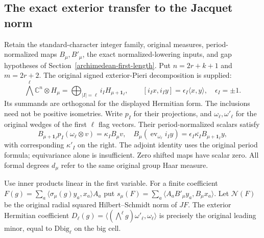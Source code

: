 \subsection{The exact exterior transfer to the Jacquet norm}
\label{archimedean-jacquet-gram}

Retain the standard-character integer family, original measures,
period-normalized maps $B_\mu,B'_\mu$, the exact normalized-lowering
inputs, and gap hypotheses of
Section~\ref{archimedean-first-length}. Put $n=2r+k+1$ and
$m=2r+2$. The original signed exterior-Pieri decomposition
is supplied:
\[
 \bigwedge^\ell\mathbb C^n\otimes H_\mu
       =\bigoplus_{|I|=\ell}i_IH_{\mu+\mathbf1_I},\qquad
 [i_Ix,i_Iy]=\epsilon_I\langle x,y\rangle,\quad\epsilon_I=\pm1.
\]
Its summands are orthogonal for the displayed Hermitian form.
The inclusions need not be positive isometries. Write $p_I$ for
their projections, and $\omega_\ell,\omega'_\ell$ for the original
wedges of the first $\ell$ flag vectors. Their period-normalized
scalars satisfy
\[
 B_{\mu+\mathbf1_I}p_I(\omega_\ell\otimes v)=\kappa_I B_\mu v,\quad
 B_\mu(\operatorname{ev}_{\omega_\ell}i_Iy)
 =\epsilon_I\overline{\kappa_I}B_{\mu+\mathbf1_I}y,
\]
with corresponding $\kappa'_I$ on the right. The adjoint identity
uses the original period formula; equivariance alone is insufficient.
Zero shifted maps have scalar zero. All formal degrees $d_\mu$
refer to the same original group Haar measure.

Use inner products linear in the first variable. For a finite
coefficient $F(g)=\sum_a\langle\sigma_\mu(g)y_a,x_a\rangle A_a$ put
$s_\mu(F)=\sum_a\langle A_aB'_\mu y_a,B_\mu x_a\rangle$.
Let $\mathcal N(F)$ be the original radial squared
Hilbert--Schmidt norm of $JF$. The exterior Hermitian coefficient
$D_\ell(g)=\langle(\bigwedge^\ell g)\omega'_\ell,\omega_\ell\rangle$
is precisely the original leading minor, equal to
$\mathrm{Dbig}_\ell$ on the big cell.


